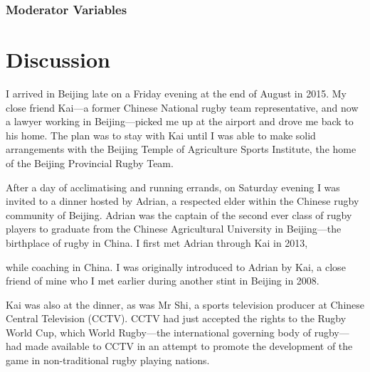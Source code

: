   \subsubsection{Moderator Variables}

  \section{Discussion}
  
































I arrived in Beijing late on a Friday evening at the end of August in 2015.  My close friend Kai---a former Chinese National rugby team representative, and now a lawyer working in Beijing---picked me up at the airport and drove me back to his home.  The plan was to stay with Kai until I was able to make solid arrangements with the Beijing Temple of Agriculture Sports Institute, the home of the Beijing Provincial Rugby Team.

After a day of acclimatising and running errands, on Saturday evening I was invited to a dinner hosted by Adrian, a respected elder within the Chinese rugby community of Beijing.  Adrian was the captain of the second ever class of rugby players to graduate from the Chinese Agricultural University in Beijing---the birthplace of rugby in China.
I first met Adrian through Kai in 2013,

 while coaching in China.  I was originally introduced to Adrian by Kai, a close friend of mine who I met earlier during another stint in Beijing in 2008.

 Kai was also at the dinner, as was Mr Shi, a sports television producer at Chinese Central Television (CCTV).  CCTV had just accepted the rights to the Rugby World Cup, which World Rugby---the international governing body of rugby---had made available to CCTV in an attempt to promote the development of the game in non-traditional rugby playing nations.


